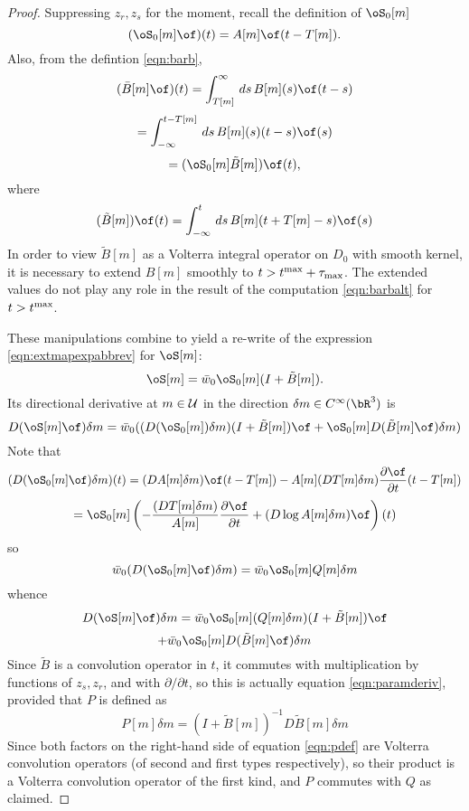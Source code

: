 \begin{proof}
Suppressing $z_r,z_s$ for the moment, recall the definition of $\oS_0[m]$
\[
(\oS_0[m]\of)(t) = A[m]\of(t-T[m]).
\]
Also, from the defintion \ref{eqn:barb}, 
\[
(\bar{B}[m]\of)(t) = 
\int_{T[m]}^{\infty}\,ds\,B[m](s)\of(t-s) 
\]
\[
=\int_{-\infty}^{t-T[m]}\,ds\,B[m](s)(t-s)\of(s)
\]
\begin{equation}
\label{eqn:barbalt}
= (\oS_0[m]\tilde{B}[m])\of(t),
\end{equation}
where
\begin{equation}
\label{eqn:tildeb}
(\tilde{B}[m])\of(t) = \int_{-\infty}^{t}\,ds\,B[m](t+T[m]-s)\of(s) 
\end{equation}
In order to view $\tilde{B}[m]$ as a Volterra integral operator on $D_0$ with
smooth kernel, it is necessary to extend $B[m]$ smoothly to $t >
t^{\rm max} + \tau_{\rm max}$. The extended values do not play
any role in the result of the computation \ref{eqn:barbalt} for $t >
t^{\rm max}$. 

These manipulations combine to yield a re-write of the expression
\ref{eqn:extmapexpabbrev} for $\oS[m]$:
\begin{equation}
\label{eqn:extmapexpabbrevalt}
\oS[m] = \bar{w}_0 \oS_0[m](I + \tilde{B}[m]).
\end{equation}
Its directional derivative at $m \in {\cal U}$ in the direction
$\delta m \in C^{\infty}(\bR^3)$ is
\[
D(\oS[m]\of)\delta m = \bar{w}_0( (D(\oS_0[m])\delta m) (I +
\tilde{B}[m])\of+\oS_0[m]D(\tilde{B}[m]\of)\delta m)
\]
Note that 
\[
(D(\oS_0[m]\of)\delta m)(t) = (DA[m]\delta m)\of(t-T[m]) -A[m](DT[m]\delta
m)\frac{\partial \of}{\partial t}(t-T[m])
\]
\[
=\oS_0[m]\left(-\frac{(DT[m]\delta m)}{A[m]}
  \frac{\partial \of}{\partial t} + (D\log A[m]\delta m)\of\right)(t)
\]
so 
\[
\bar{w}_0(D(\oS_0[m]\of)\delta m) =  \bar{w}_0\oS_0[m]Q[m]\delta m
\]
whence
\[
D(\oS[m]\of)\delta m = \bar{w}_0\oS_0[m] (Q[m]\delta m)(I+\tilde{B}[m])\of 
\]
\[
+ \bar{w}_0\oS_0[m]D(\tilde{B}[m]\of)\delta m 
\]
Since $\tilde{B}$ is a convolution operator in $t$, it commutes with
multiplication by functions of $z_s,z_r$, and with $\partial/\partial
t$, so this is actually equation \ref{eqn:paramderiv}, provided that
$P$ is defined as 
\begin{equation}
\label{eqn:pdef}
P[m]\delta m = (I + \tilde{B}[m])^{-1}D\tilde{B}[m] \delta m
\end{equation}
Since both factors on the right-hand side of equation \ref{eqn:pdef}
are Volterra convolution operators (of second and first types
respectively), so their product is a Volterra convolution operator of
the first kind, and $P$ commutes with $Q$ as claimed.
\end{proof}

